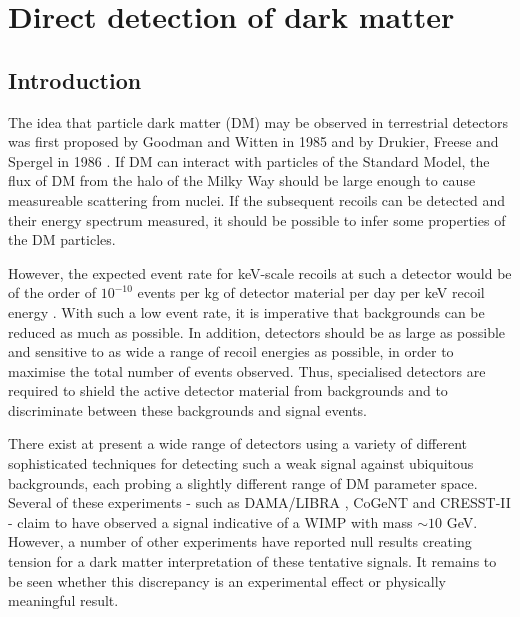 \chapter{Direct detection of dark matter}
\label{ch:DD}

\section{Introduction}


The idea that particle dark matter (DM) may be observed in terrestrial detectors was first proposed by Goodman and Witten in 1985 \cite{Goodman:1985} and by Drukier, Freese and Spergel in 1986 \cite{Drukier:1986}. If DM can interact with particles of the Standard Model, the flux of DM from the halo of the Milky Way should be large enough to cause measureable scattering from nuclei. If the subsequent recoils can be detected and their energy spectrum measured, it should be possible to infer some properties of the DM particles.

However, the expected event rate for keV-scale recoils at such a detector would be of the order of $10^{-10}$ events per kg of detector material per day per keV recoil energy \cite{Cerdeno:2010}. With such a low event rate, it is imperative that backgrounds can be reduced as much as possible. In addition, detectors should be as large as possible and sensitive to as wide a range of recoil energies as possible, in order to maximise the total number of events observed. Thus, specialised detectors are required to shield the active detector material from backgrounds and to discriminate between these backgrounds and signal events.

There exist at present a wide range of detectors using a variety of different sophisticated techniques for detecting such a weak signal against ubiquitous backgrounds, each probing a slightly different range of DM parameter space. Several of these experiments - such as DAMA/LIBRA \cite{Bernabei:2010}, CoGeNT \cite{Aalseth:2011a, Aalseth:2011b} and CRESST-II \cite{Stodolsky:2012} - claim to have observed a signal indicative of a WIMP with mass $\sim 10$ GeV. However, a number of other experiments have reported null results creating tension for a dark matter interpretation of these tentative signals. It remains to be seen whether this discrepancy is an experimental effect or physically meaningful result. 

